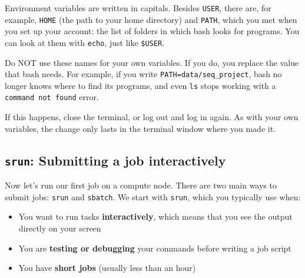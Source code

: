 \documentclass[
  letterpaper,
  DIV=11,
  numbers=noendperiod]{scrreprt}
\providecommand{\tightlist}{%
  \setlength{\itemsep}{0pt}\setlength{\parskip}{0pt}}
\begin{document}
\begin{tcolorbox}[enhanced jigsaw, colbacktitle=quarto-callout-important-color!10!white, rightrule=.15mm, leftrule=.75mm, colback=white, opacitybacktitle=0.6, title=\textcolor{quarto-callout-important-color}{\faExclamation}\hspace{0.5em}{Important: Don't overwrite environment variables}, bottomrule=.15mm, left=2mm, colframe=quarto-callout-important-color-frame, opacityback=0, breakable, bottomtitle=1mm, coltitle=black, arc=.35mm, toprule=.15mm, toptitle=1mm, titlerule=0mm]

Environment variables are written in capitals. Besides \texttt{USER},
there are, for example, \texttt{HOME} (the path to your home directory)
and \texttt{PATH}, which you met when you set up your account: the list
of folders in which bash looks for programs. You can look at them with
\texttt{echo}, just like \texttt{\$USER}.

Do NOT use these names for your own variables. If you do, you replace
the value that bash needs. For example, if you write
\texttt{PATH=data/seq\_project}, bash no longer knows where to find its
programs, and even \texttt{ls} stops working with a
\texttt{command\ not\ found} error.

If this happens, close the terminal, or log out and log in again. As
with your own variables, the change only lasts in the terminal window
where you made it.

\end{tcolorbox}

\subsection{\texorpdfstring{\texttt{srun}: Submitting a job
interactively}{srun: Submitting a job interactively}}\label{srun-submitting-a-job-interactively}

Now let's run our first job on a compute node. There are two main ways
to submit jobs: \texttt{srun} and \texttt{sbatch}. We start with
\texttt{srun}, which you typically use when:

\begin{itemize}
\tightlist
\item
  You want to run tasks \textbf{interactively}, which means that you see
  the output directly on your screen
\item
  You are \textbf{testing or debugging} your commands before writing a
  job script
\item
  You have \textbf{short jobs} (usually less than an hour)
\end{itemize}
\end{document}
